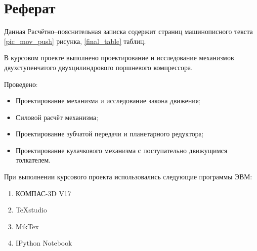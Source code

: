 \section*{Реферат}
Данная Расчётно--пояснительная записка содержит \pageref{final_page} 
страниц машинописного текста \ref{pic_mov_push} 
рисунка, \ref{final_table} 
таблиц. 

В курсовом проекте выполнено проектирование и исследование механизмов двухступенчатого двухцилиндрового поршневого компрессора.

Проведено:
\begin{itemize}
	\item Проектирование механизма и исследование закона движения;
	\item Силовой расчёт механизма;
	\item Проектирование зубчатой передачи и планетарного редуктора;
	\item Проектирование кулачкового механизма с поступательно движущимся толкателем.
\end{itemize} 

При выполнении курсового проекта использовались следующие программы ЭВМ:

\begin{enumerate}
	\item КОМПАС-3D V17
	\item TeXstudio
	\item MikTex
	\item IPython Notebook
\end{enumerate}